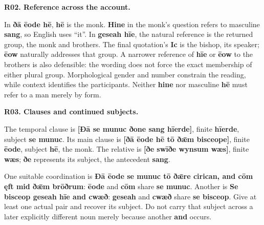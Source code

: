 \par\begin{minipage}{\linewidth}\raggedright
\textbf{R02. Reference across the account.}

In \textbf{ðā ēode hē}, \textbf{hē} is the monk. \textbf{Hine} in the monk’s question refers to masculine \textbf{sang}, so English uses “it”. In \textbf{geseah hīe}, the natural reference is the returned group, the monk and brothers. The final quotation’s \textbf{Ic} is the bishop, its speaker; \textbf{ēow} naturally addresses that group. A narrower reference of \textbf{hīe} or \textbf{ēow} to the brothers is also defensible: the wording does not force the exact membership of either plural group. Morphological gender and number constrain the reading, while context identifies the participants. Neither \textbf{hine} nor masculine \textbf{hē} must refer to a man merely by form.

\end{minipage}\par\addvspace{4pt}

\par\begin{minipage}{\linewidth}\raggedright
\textbf{R03. Clauses and continued subjects.}

The temporal clause is \textbf{[Ðā se munuc ðone sang hīerde]}, finite \textbf{hīerde}, subject \textbf{se munuc}. Its main clause is \textbf{[ðā ēode hē tō ðǣm bisceope]}, finite \textbf{ēode}, subject \textbf{hē}, the monk. The relative is \textbf{[ðe swīðe wynsum wæs]}, finite \textbf{wæs}; \textbf{ðe} represents its subject, the antecedent \textbf{sang}.

One suitable coordination is \textbf{Ðā ēode se munuc tō ðǣre cirican, and cōm ęft mid ðǣm brōðrum}: \textbf{ēode} and \textbf{cōm} share \textbf{se munuc}. Another is \textbf{Se bisceop geseah hīe and cwæð}: \textbf{geseah} and \textbf{cwæð} share \textbf{se bisceop}. Give at least one actual pair and recover its subject. Do not carry that subject across a later explicitly different noun merely because another \textbf{and} occurs.

\end{minipage}\par\addvspace{4pt}

